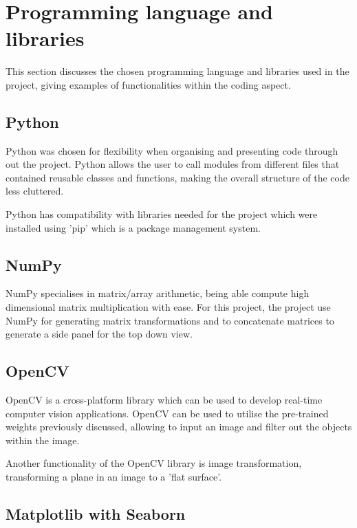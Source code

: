 \documentclass[12pt]{report}
\begin{document}
\section{Programming language and libraries}

This section discusses the chosen programming language and libraries used in the project, giving examples of functionalities within the coding aspect.

\subsection*{Python}

Python was chosen for flexibility when organising and presenting code through out the project. Python allows the user to call modules from different files that contained reusable classes and functions, making the overall structure of the code less cluttered.

\vspace{2mm}

Python has compatibility with libraries needed for the project which were installed using 'pip' which is a package management system.

\subsection*{NumPy}

NumPy specialises in matrix/array arithmetic, being able compute high dimensional matrix multiplication with ease. For this project, the project use NumPy for generating matrix transformations and to concatenate matrices to generate a side panel for the top down view. 

\subsection*{OpenCV}

OpenCV is a cross-platform library which can be used to develop real-time computer vision applications. OpenCV can be used to utilise the pre-trained weights previously discussed, allowing to input an image and filter out the objects within the image.

\vspace{2mm}

Another functionality of the OpenCV library is image transformation, transforming a plane in an image to a 'flat surface'.


\subsection*{Matplotlib with Seaborn}
\end{document}
